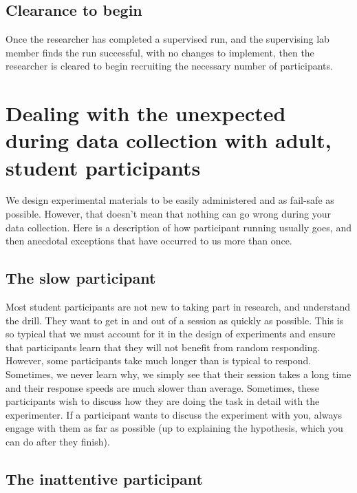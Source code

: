 \documentclass[12pt,]{book}
\theoremstyle{definition}
\theoremstyle{definition}
\theoremstyle{definition}
\theoremstyle{remark}
\begin{document}
\section{Clearance to begin}\label{clearance-to-begin}

Once the researcher has completed a supervised run, and the supervising
lab member finds the run successful, with no changes to implement, then
the researcher is cleared to begin recruiting the necessary number of
participants.

\chapter{Dealing with the unexpected during data collection with adult,
student
participants}\label{dealing-with-the-unexpected-during-data-collection-with-adult-student-participants}

We design experimental materials to be easily administered and as
fail-safe as possible. However, that doesn't mean that nothing can go
wrong during your data collection. Here is a description of how
participant running usually goes, and then anecdotal exceptions that
have occurred to us more than once.

\section{The slow participant}\label{the-slow-participant}

Most student participants are not new to taking part in research, and
understand the drill. They want to get in and out of a session as
quickly as possible. This is so typical that we must account for it in
the design of experiments and ensure that participants learn that they
will not benefit from random responding. However, some participants take
much longer than is typical to respond. Sometimes, we never learn why,
we simply see that their session takes a long time and their response
speeds are much slower than average. Sometimes, these participants wish
to discuss how they are doing the task in detail with the experimenter.
If a participant wants to discuss the experiment with you, always engage
with them as far as possible (up to explaining the hypothesis, which you
can do after they finish).

\section{The inattentive participant}\label{the-inattentive-participant}
\end{document}

